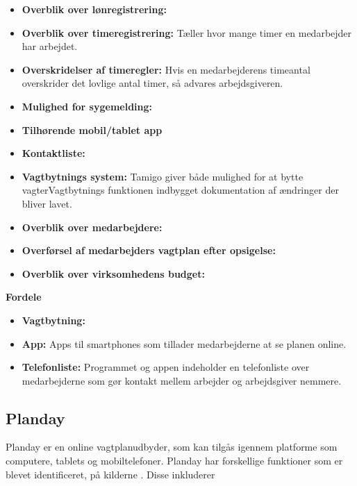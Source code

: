 \begin{itemize}
\item {\textbf{Overblik over lønregistrering:}} 
\item {\textbf{Overblik over timeregistrering:} Tæller hvor mange timer en medarbejder har arbejdet.}
\item {\textbf{Overskridelser af timeregler:} Hvis en medarbejderens timeantal overskrider det lovlige antal timer, så advares arbejdsgiveren.}
\item {\textbf{Mulighed for sygemelding:}}
\item {\textbf{Tilhørende mobil/tablet app}}
\item {\textbf{Kontaktliste:}}
\item {\textbf{Vagtbytnings system:} Tamigo giver både mulighed for at bytte vagterVagtbytnings funktionen indbygget dokumentation af ændringer der bliver lavet.}
\item {\textbf{Overblik over medarbejdere:}}
\item {\textbf{Overførsel af medarbejders vagtplan efter opsigelse:}}
\item {\textbf{Overblik over virksomhedens budget:}}

\end{itemize}

\textbf{Fordele} 
\begin{itemize}
\item {\textbf{Vagtbytning:} }
\item {\textbf{App:} Apps til smartphones som tillader medarbejderne at se planen online.}
\item {\textbf{Telefonliste:} Programmet og appen indeholder en telefonliste over medarbejderne som gør kontakt mellem arbejder og arbejdsgiver nemmere.}\\
\end{itemize}

\subsection{Planday}
Planday er en online vagtplanudbyder, som kan tilgås igennem platforme som computere, tablets og mobiltelefoner. Planday har forskellige funktioner som er blevet identificeret, på kilderne \citep{DanskInternetHandel, Simonsen2014, Planday, Play, Play}. Disse inkluderer\\

